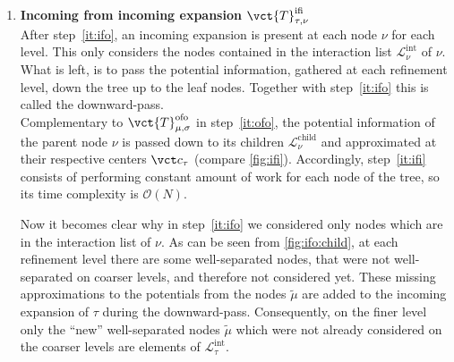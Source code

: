 \begin{enumerate}
  \item \textbf{Incoming from incoming expansion $\vct{T}_{\tau,\nu}^{\mathrm{ifi}}$}
    \\
    After step~\ref{it:ifo}, an incoming expansion is present at each node $\nu$ for each level.
    This only considers the nodes contained in the interaction list $\mathcal{L}_{\nu}^\text{int}$ of $\nu$.
    What is left, is to pass the potential information, gathered at each refinement level, down the tree up to the leaf nodes.
    Together with step~\ref{it:ifo} this is called the downward-pass.
    \\
    Complementary to $\vct{T}_{\mu,\sigma}^{\mathrm{ofo}}$ in step~\ref{it:ofo}, the potential information of the parent node $\nu$ is passed down to its children $\mathcal{L}_{\nu}^{\text{child}}$ and approximated at their respective centers $\vct c_\tau$ (compare \cref{fig:ifi}).
    Accordingly, step~\ref{it:ifi} consists of performing constant amount of work for each node of the tree, so its time complexity is $\mathcal{O}(N)$.

    Now it becomes clear why in step~\ref{it:ifo} we considered only nodes which are in the interaction list of $\nu$.
    As can be seen from \cref{fig:ifo:child}, at each refinement level there are some well-separated nodes, that were not well-separated on coarser levels, and therefore not considered yet.
    These missing approximations to the potentials from the nodes $\widetilde\mu$ are added to the incoming expansion of $\tau$ during the downward-pass.
    Consequently, on the finer level only the ``new'' well-separated nodes $\widetilde\mu$ which were not already considered on the coarser levels are elements of $\mathcal{L}_\tau^\text{int}$.

    \begin{figure}
      \centering
        \null\hfill
\end{figure}
\end{enumerate}
